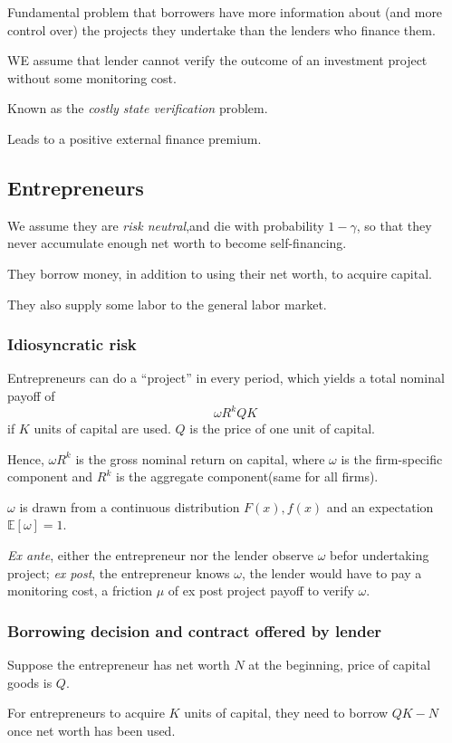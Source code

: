 Fundamental problem that borrowers have more information
about (and more control over) the projects they undertake
than the lenders who finance them.

WE assume that lender cannot verify the outcome of an investment project
without some monitoring cost.

Known as the \textit{costly state verification} problem.

Leads to a positive external finance premium.

\subsection{Entrepreneurs}
We assume they are \textit{risk neutral},and die with probability $1-\gamma$,
so that they never accumulate enough net worth to become self-financing.

They borrow money, in addition to using their net worth, to acquire capital.

They also supply some labor to the general labor market.

\subsubsection{Idiosyncratic risk}
Entrepreneurs can do a “project” in every period, which yields
a total nominal payoff of
\[\omega R^k Q K\]
if $K$ units of capital are used. $Q$ is the price of one unit of capital.

Hence, $\omega R^k$ is the gross nominal return on capital, where $\omega$ is the
firm-specific component and $R^k$ is the aggregate component(same for all firms).

$\omega$ is drawn from a continuous distribution $F(x), f(x)$ and an expectation $\mathbb{E}[\omega] =1$.

\textit{Ex ante}, either the entrepreneur nor the lender observe $\omega $ befor undertaking project;
\textit{ex post}, the entrepreneur knows $\omega$, the lender would have to pay a monitoring cost, 
a friction $\mu$ of ex post project payoff to verify $\omega$.

\subsubsection{Borrowing decision and contract offered by lender}
Suppose the entrepreneur has net worth $N$ at the beginning, price of capital goods is $Q$.

For entrepreneurs to acquire $K$ units of capital, they need to borrow $QK-N$ once net worth has been used.

